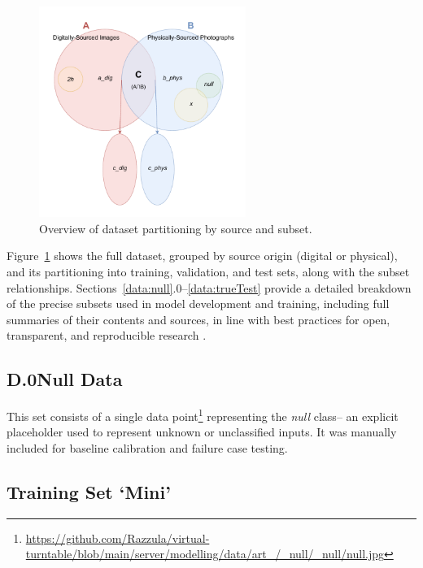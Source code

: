 \begin{uomappendix}
            \begin{figure}[H]
                \centering
                \includegraphics[width=0.6\textwidth]{images/DataVenn.pdf}
                \caption{Overview of dataset partitioning by source and subset.}
                \label{fig:dataVenn}
            \end{figure}
    
            Figure~\ref{fig:dataVenn} shows the full dataset, grouped by source origin (digital or physical), and its partitioning into training, validation, and test sets, along with the subset relationships. Sections~\ref{data:null}.0--\ref{data:trueTest} provide a detailed breakdown of the precise subsets used in model development and training, including full summaries of their contents and sources, in line with best practices for open, transparent, and reproducible research \cite{Mitchell_2019}.
    
            \subsection*{D.0\quad Null Data} \label{data:null}
    
                This set consists of a single data point\footnote{\url{https://github.com/Razzula/virtual-turntable/blob/main/server/modelling/data/art_/_null/_null/null.jpg}} representing the \textit{null} class-- an explicit placeholder used to represent unknown or unclassified inputs. It was manually included for baseline calibration and failure case testing.
    
            \subsection{Training Set `Mini'} \label{data:mini}
    

\end{uomappendix}
